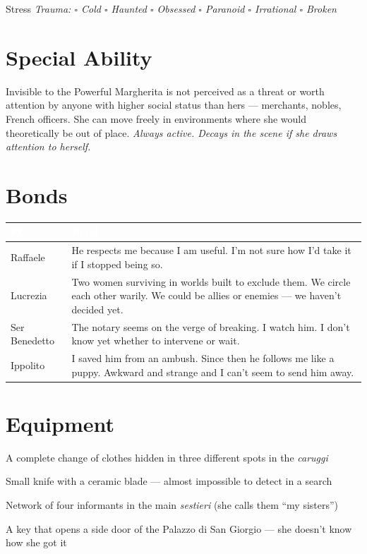 \medskip
\begin{pgclockbox}{Stress \hfill {}}
\small\textit{Trauma: $\square$ Cold \quad $\square$ Haunted \quad $\square$ Obsessed \quad $\square$ Paranoid \quad $\square$ Irrational \quad $\square$ Broken}
\end{pgclockbox}

\section*{Special Ability}
\begin{spinolabox}{Invisible to the Powerful}
Margherita is not perceived as a threat or worth attention by anyone with higher
social status than hers --- merchants, nobles, French officers. She can move freely
in environments where she would theoretically be out of place.
\textit{Always active. Decays in the scene if she draws attention to herself.}
\end{spinolabox}

\section*{Bonds}
\begin{table}[h]\centering\renewcommand{\arraystretch}{1.4}
\begin{tabularx}{\linewidth}{@{}L{2.6cm} X@{}}
\toprule{}
\textcolor{white}{\textbf{PC}} & \textcolor{white}{\textbf{Bond}} \\
\midrule
Raffaele & He respects me because I am useful. I'm not sure how I'd take it if I stopped being so. \\
Lucrezia & Two women surviving in worlds built to exclude them. We circle each other warily. We could be allies or enemies --- we haven't decided yet. \\
Ser Benedetto & The notary seems on the verge of breaking. I watch him. I don't know yet whether to intervene or wait. \\
Ippolito & I saved him from an ambush. Since then he follows me like a puppy. Awkward and strange and I can't seem to send him away. \\
\bottomrule
\end{tabularx}
\end{table}

\section*{Equipment}
\begin{goldlist}
\item A complete change of clothes hidden in three different spots in the \textit{caruggi}
\item Small knife with a ceramic blade --- almost impossible to detect in a search
\item Network of four informants in the main \textit{sestieri} (she calls them ``my sisters'')
\item A key that opens a side door of the Palazzo di San Giorgio --- she doesn't know how she got it
\end{goldlist}

